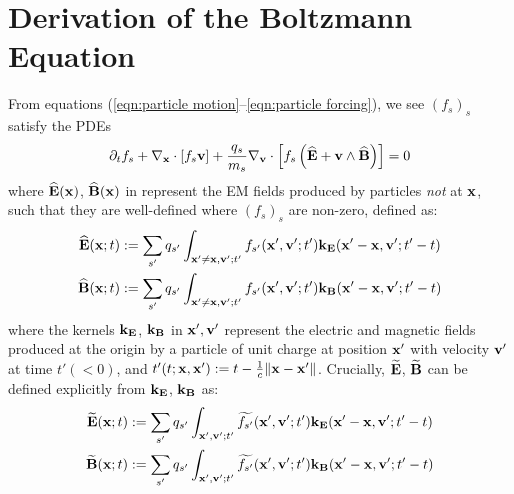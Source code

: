 \chapter{Derivation of the Boltzmann Equation}\label{sec:Boltzmann equation derivation}
    From equations (\ref{eqn:particle motion}–\ref{eqn:particle forcing}), we see $(f_{s})_{s}$ satisfy the PDEs
    \begin{equation}\label{eqn:exact Boltzmann equation}
        \partial_{t}f_{s} + \nabla_{\mathbf{x}}\cdot[f_{s}\mathbf{v}] + \frac{q_{s}}{m_{s}}\nabla_{\mathbf{v}}\cdot\left[f_{s}\left(\widehat{\mathbf{E}} + \mathbf{v}\wedge\widehat{\mathbf{B}}\right)\right]  =  0
    \end{equation}
    where $\widehat{\mathbf{E}}(\mathbf{x})$, $\widehat{\mathbf{B}}(\mathbf{x})$ in represent the EM fields produced by particles \emph{not} at $\mathbf{x}$, such that they are well-defined where $(f_{s})_{s}$ are non-zero, defined as:
    \begin{align}
        \widehat{\mathbf{E}}(\mathbf{x}; t)  &:=  \sum_{s'}q_{s'}\int_{\mathbf{x}' \neq \mathbf{x}, \mathbf{v}'; t'}f_{s'}(\mathbf{x}', \mathbf{v}'; t')\mathbf{k}_{\mathbf{E}}(\mathbf{x}' - \mathbf{x}, \mathbf{v}'; t' - t)  \\
        \widehat{\mathbf{B}}(\mathbf{x}; t)  &:=  \sum_{s'}q_{s'}\int_{\mathbf{x}' \neq \mathbf{x}, \mathbf{v}'; t'}f_{s'}(\mathbf{x}', \mathbf{v}'; t')\mathbf{k}_{\mathbf{B}}(\mathbf{x}' - \mathbf{x}, \mathbf{v}'; t' - t)
    \end{align}
    where the kernels $\mathbf{k}_{\mathbf{E}}$, $\mathbf{k}_{\mathbf{B}}$ in $\mathbf{x}', \mathbf{v}'$ represent the electric and magnetic fields produced at the origin by a particle of unit charge at position $\mathbf{x}'$ with velocity $\mathbf{v}'$ at time $t' (< 0)$, and $t'(t; \mathbf{x}, \mathbf{x}') := t - \frac{1}{c}\|\mathbf{x} - \mathbf{x}'\|$.  Crucially, $\widetilde{\mathbf{E}}$, $\widetilde{\mathbf{B}}$ can be defined explicitly from $\mathbf{k}_{\mathbf{E}}$, $\mathbf{k}_{\mathbf{B}}$ as:
    \begin{align}
        \widetilde{\mathbf{E}}(\mathbf{x}; t)  &:=  \sum_{s'}q_{s'}\int_{\mathbf{x}', \mathbf{v}'; t'}\widetilde{f_{s'}}(\mathbf{x}', \mathbf{v}'; t')\mathbf{k}_{\mathbf{E}}(\mathbf{x}' - \mathbf{x}, \mathbf{v}'; t' - t)  \label{eqn:explicit electric field}  \\
        \widetilde{\mathbf{B}}(\mathbf{x}; t)  &:=  \sum_{s'}q_{s'}\int_{\mathbf{x}', \mathbf{v}'; t'}\widetilde{f_{s'}}(\mathbf{x}', \mathbf{v}'; t')\mathbf{k}_{\mathbf{B}}(\mathbf{x}' - \mathbf{x}, \mathbf{v}'; t' - t)  \label{eqn:explicit magnetic field}
    \end{align}

